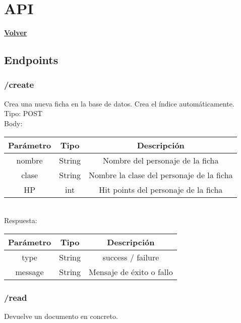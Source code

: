 \documentclass[a4paper,12pt]{article}
\begin{document}
\clearpage

\section{API}
\hyperlink{anchor-indice}{\textbf{Volver}}\\

\subsection{Endpoints}

\subsubsection{/create}
Crea una nueva ficha en la base de datos. Crea el índice automáticamente.\\

Tipo: POST\\

Body:\\

\begin{tabular}{|c|c|c|}
    \hline
    \textbf{Parámetro} & \textbf{Tipo}  & \textbf{Descripción}\\ 
    \hline
    nombre & String & Nombre del personaje de la ficha\\ 
    \hline
    clase & String & Nombre la clase del personaje de la ficha\\ 
    \hline
    HP & int & Hit points del personaje de la ficha\\ 
    \hline
\end{tabular}\\

Respuesta:\\

\begin{tabular}{|c|c|c|}
    \hline
    \textbf{Parámetro} & \textbf{Tipo}  & \textbf{Descripción}\\ 
    \hline
    type & String & success / failure\\ 
    \hline
    message & String & Mensaje de éxito o fallo\\ 
    \hline
\end{tabular}

\subsubsection{/read}
Devuelve un documento en concreto.\\
\end{document}
